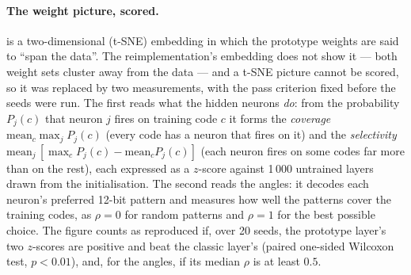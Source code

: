 \paragraph{The weight picture, scored.}
 is a two-dimensional (t-SNE) embedding in which the prototype weights are said
to ``span the data''.  The reimplementation's embedding does not show it --- both weight sets
cluster away from the data --- and a t-SNE picture cannot be scored, so it was replaced by two
measurements, with the pass criterion fixed before the seeds were run.  The first reads what
the hidden neurons \emph{do}: from the probability $P_j(c)$ that neuron $j$ fires on training
code $c$ it forms the \emph{coverage} $\mathrm{mean}_c \max_j P_j(c)$ (every code has a neuron
that fires on it) and the \emph{selectivity}
$\mathrm{mean}_j\,[\max_c P_j(c) - \mathrm{mean}_c P_j(c)]$ (each neuron fires on some codes far
more than on the rest), each expressed as a $z$-score against 1\,000 untrained layers drawn from
the initialisation.  The second reads the angles: it decodes each neuron's preferred 12-bit
pattern and measures how well the patterns cover the training codes, as $\rho = 0$ for random
patterns and $\rho = 1$ for the best possible choice.  The figure counts as reproduced if, over
20 seeds, the prototype layer's two $z$-scores are positive and beat the classic layer's (paired one-sided Wilcoxon test, $p < 0.01$), and, for the angles, if its median $\rho$ is
at least $0.5$.

